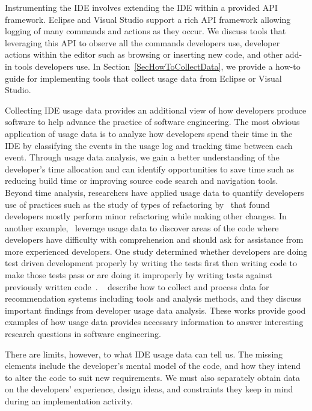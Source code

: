 \documentclass[authoryear]{elsarticle}
\begin{document}
Instrumenting the IDE involves extending the IDE within a provided API framework.  Eclipse and Visual Studio support a rich API framework allowing logging of many commands and actions as they occur.  We discuss tools that leveraging this API to observe all the commands developers use, developer actions within the editor such as browsing or inserting new code, and other add-in tools developers use.  In Section~\ref{SecHowToCollectData}, we provide a how-to guide for implementing tools that collect usage data from Eclipse or Visual Studio.  

Collecting IDE usage data provides an additional view of how developers produce software to help advance the practice of software engineering.  
The most obvious application of usage data is to analyze how developers spend their time in the IDE by classifying the events in the usage log and tracking time between each event.  Through usage data analysis, we gain a better understanding of the developer's time allocation and can identify opportunities to save time such as reducing build time or improving source code search and navigation tools.  Beyond time analysis, researchers have applied usage data to quantify developers use of practices such as the study of types of refactoring by~\citet{V:MurphyHill2012How} that found developers mostly perform minor refactoring while making other changes.  In another example,~\citet{Carter2010Are} leverage usage data to discover areas of the code where developers have difficulty with comprehension and should ask for assistance from more experienced developers.  One study determined whether developers are doing test driven development properly by writing the tests first then writing code to make those tests pass or are doing it improperly by writing tests against previously written code~\citep{Kou2010Operational}.  ~\citet{fritzBookChapter} describe how to collect and process data for recommendation systems including tools and analysis methods, and they discuss important findings from developer usage data analysis.    These works provide good examples of how usage data provides necessary information to answer interesting research questions in software engineering.

There are limits, however, to what IDE usage data can tell us.  The missing elements include the developer's mental model of the code, and how they intend to alter the code to suit new requirements.  We must also separately obtain data on the developers' experience, design ideas, and constraints they keep in mind during an implementation activity.  
\end{document}
